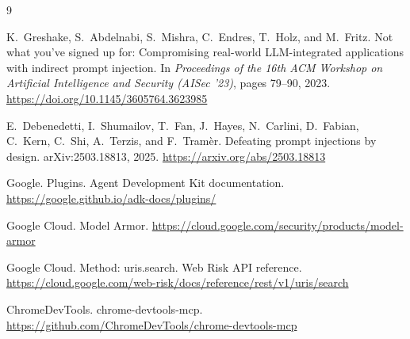 \documentclass[11pt]{article}
\begin{document}
\begin{thebibliography}{9}

K.~Greshake, S.~Abdelnabi, S.~Mishra, C.~Endres, T.~Holz, and M.~Fritz.
\newblock Not what you've signed up for: Compromising real-world LLM-integrated applications with indirect prompt injection.
\newblock In \emph{Proceedings of the 16th ACM Workshop on Artificial Intelligence and Security (AISec '23)}, pages 79--90, 2023.
\newblock \url{https://doi.org/10.1145/3605764.3623985}

E.~Debenedetti, I.~Shumailov, T.~Fan, J.~Hayes, N.~Carlini, D.~Fabian, C.~Kern, C.~Shi, A.~Terzis, and F.~Tram\`er.
\newblock Defeating prompt injections by design.
\newblock arXiv:2503.18813, 2025.
\newblock \url{https://arxiv.org/abs/2503.18813}

Google.
\newblock Plugins. Agent Development Kit documentation.
\newblock \url{https://google.github.io/adk-docs/plugins/}

Google Cloud.
\newblock Model Armor.
\newblock \url{https://cloud.google.com/security/products/model-armor}

Google Cloud.
\newblock Method: uris.search. Web Risk API reference.
\newblock \url{https://cloud.google.com/web-risk/docs/reference/rest/v1/uris/search}

ChromeDevTools.
\newblock chrome-devtools-mcp.
\newblock \url{https://github.com/ChromeDevTools/chrome-devtools-mcp}

\end{thebibliography}
\end{document}
